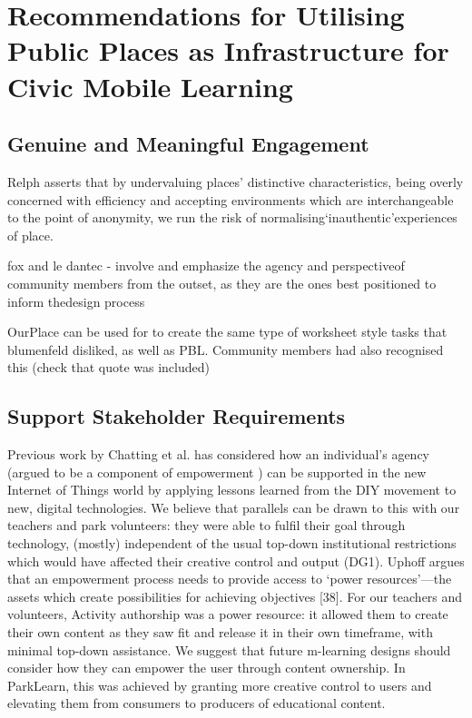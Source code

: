 \section{Recommendations for Utilising Public Places as Infrastructure for Civic Mobile Learning}

\subsection{Genuine and Meaningful Engagement}

Relph asserts that by undervaluing places’ distinctive characteristics, being overly concerned with efficiency and accepting environments which are interchangeable to the point of anonymity, we run the risk of normalising‘inauthentic’experiences of place.

fox and le dantec - involve and emphasize the agency and perspectiveof community members from the outset, as they are the ones best positioned to inform thedesign process

OurPlace can be used for to create the same type of worksheet style tasks that blumenfeld disliked, as well as PBL. Community members had also recognised this (check that quote was included) 

\subsection{Support Stakeholder Requirements}

Previous work by Chatting et al. \citep{Chatting2017} has considered how an individual’s agency (argued to be a component of empowerment \citep{Ibrahim2007}) can be supported in the new Internet of Things world by applying lessons learned from the DIY movement to new, digital technologies. We believe that parallels can be drawn to this with our teachers and park volunteers: they were able to fulfil their goal through technology, (mostly) independent of the usual top-down institutional restrictions which would have affected their creative control and output (DG1). Uphoff argues that an empowerment process needs to provide access to ‘power resources’—the assets which create possibilities for achieving objectives [38]. For our teachers and volunteers, Activity authorship was a power resource: it allowed them to create their own content as they saw fit and release it in their own timeframe, with minimal top-down assistance. We suggest that future m-learning designs should consider how they can empower the user through content ownership. In ParkLearn, this was achieved by granting more creative control to users and elevating them from consumers to producers of educational content.


